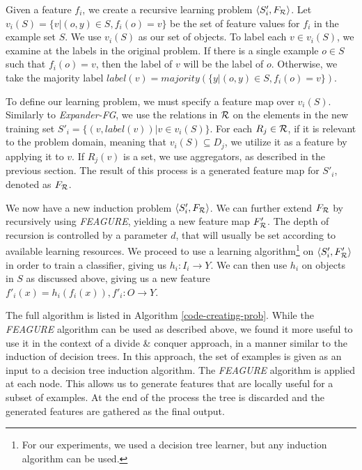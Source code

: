 \documentclass[letterpaper]{article} %
\theoremstyle{definition}
\begin{document}
Given a feature $f_{i}$, we create a recursive learning problem $\langle S'_i,F_{\cal R} \rangle$. %
Let $v_i(S) = \{v | (o,y) \in S, f_{i}(o)=v\}$ be the set of feature values for $f_i$ in the example set $S$. %
We use $v_i(S)$ as our set of objects. To label each $v \in v_i(S)$, we examine at the labels in the original problem.
If there is a single example $o \in S$ such that $f_i(o)=v$, then the label of $v$ will be the label of $o$. Otherwise, we take the majority label  $label(v)=majority(\{y|(o,y)\in S, f_i(o)=v\})$.

To define our learning problem, we must specify a feature map over $v_i(S)$. Similarly to \emph{Expander-FG}, we use the relations in ${\cal R}$ on the elements in the new training set $S'_i = \{ (v, label(v)) | v \in v_i(S) \}$.
For each $R_j\in {\cal R}$, if it is relevant to the problem domain, meaning that $v_i(S)\subseteq D_j$, we utilize it as a feature by applying it to $v$. If $R_j(v)$ is a set, we use aggregators, as described in the previous section. 
The result of this process is a generated feature map for $S'_i$, denoted as $F_{\cal R}$. 

We now have a new induction problem $\langle S'_i,F_{\cal R} \rangle$.
We can further extend $F_{\cal R}$ by recursively using \emph{FEAGURE}, yielding a new feature map $F'_{\cal R}$. The depth of recursion is controlled by a parameter $d$, that will usually be set according to available learning resources.
We proceed to use a learning algorithm\footnote{For our experiments, we used a decision tree learner, but any induction algorithm can be used.} on $\langle S'_i,F'_{\cal R} \rangle$ in order to train a classifier, giving us $h_i:I_i\rightarrow Y$. We can then use $h_i$ on objects in $S$ as discussed above, giving us a new feature $f'_{i}(x)=h_{i}(f_{i}(x)), f'_{i}:O\rightarrow Y$. 

The full algorithm is listed in Algorithm \ref{code-creating-prob}.
While the \emph{FEAGURE} algorithm can be used as described above, we found it more useful to use it in the context of a divide \& conquer approach, in a manner similar to the induction of decision trees.
In this approach, the set of examples is given as an input to a decision tree induction algorithm. The \emph{FEAGURE} algorithm is applied at each node. 
This allows us to generate features that are locally useful for a subset of examples.
At the end of the process the tree is discarded and the generated features are gathered as the final output.
\end{document}
